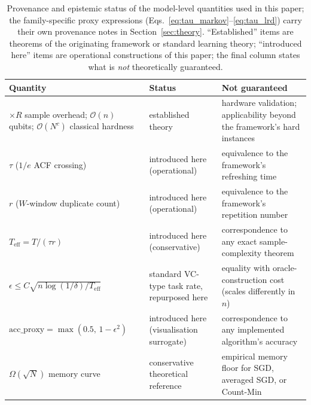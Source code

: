 \documentclass[sensors,article,submit,pdftex,moreauthors]{Definitions/mdpi}
\newcommand{\bigO}{\mathcal{O}}
\newcommand{\Teff}{T_{\mathrm{eff}}}
\providecommand{\DIFadd}[1]{{\protect\color{blue}#1}} %
\providecommand{\DIFdel}[1]{} %
\providecommand{\DIFaddbegin}{} %
\providecommand{\DIFdelbegin}{} %
\providecommand{\DIFdelend}{} %
\providecommand{\DIFaddFL}[1]{\DIFadd{#1}} %
\begin{document}
\DIFdelbegin \DIFdel{The heuristic classification accuracy proxy used in our experiments is: }\begin{displaymath}
\DIFdel{\mathrm{acc\_proxy} = \max\!\left(0.5,\; 1 - \epsilon^2\right),
\label{eq:acc_proxy}
}\end{displaymath}%
\DIFdel{where the floor of $0.5$ represents the random-guess baseline for binary classification. When $\epsilon^2 > 0.5$ (as occurs in the long-memory regime), }\DIFdelend \DIFaddbegin \begin{table}[t]
\centering
\caption{\DIFaddFL{Provenance and epistemic status of the model-level quantities used in this paper; the family-specific proxy expressions (Eqs.~\eqref{eq:tau_markov}--\eqref{eq:tau_lrd}) carry their own provenance notes in Section~\ref{sec:theory}. ``Established'' items are theorems of the originating framework or standard learning theory; ``introduced here'' items are operational constructions of this paper; the final column states what is }\emph{\DIFaddFL{not}} \DIFaddFL{theoretically guaranteed.}}
\label{tab:provenance}
\begin{tabularx}{\textwidth}{@{}p{5.1cm}p{3.6cm}X@{}}
\toprule
Quantity & Status & Not guaranteed \\
\midrule
$\times R$ sample overhead; $\bigO(n)$ qubits; $\bigO(N^{c})$ classical hardness & established theory & hardware validation; applicability beyond the framework's hard instances \\
$\tau$ ($1/e$ ACF crossing) & introduced here (operational) & equivalence to the framework's refreshing time \\
$r$ ($W$-window duplicate count) & introduced here (operational) & equivalence to the framework's repetition number \\
$\Teff = T/(\tau r)$ & introduced here (conservative) & correspondence to any exact sample-complexity theorem \\
$\epsilon \leq C\sqrt{n \log(1/\delta)/\Teff}$ & standard VC-type task rate, repurposed here & equality with oracle-construction cost (scales differently in $n$) \\
$\mathrm{acc\_proxy} = \max(0.5,\, 1 - \epsilon^2)$ & introduced here (visualisation surrogate) & correspondence to any implemented algorithm's accuracy \\
$\Omega(\sqrt{N})$ memory curve & conservative theoretical reference & empirical memory floor for SGD, averaged SGD, or Count-Min \\
\bottomrule
\end{tabularx}
\end{table}
\end{document}
